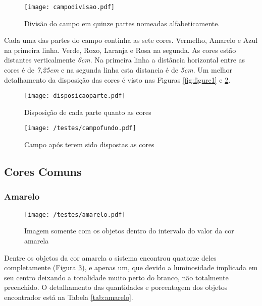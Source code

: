 \begin{figure}[H]
		\centering
		\texttt{[image: campodivisao.pdf]}
		\caption{Divisão do campo em quinze partes nomeadas alfabeticamente.}
		\label{campodivisao}
	\end{figure}
	
Cada uma das partes do campo continha as sete cores. Vermelho, Amarelo e Azul na primeira linha. Verde, Roxo, Laranja e Rosa na segunda. As cores estão distantes verticalmente \textit{6cm}. Na primeira linha a distância horizontal entre as cores é de \textit{7,25cm} e na segunda linha esta distancia é de \textit{5cm}. Um  melhor detalhamento da disposição das cores é visto nas Figuras \ref{fig:figure1} e \ref{fig:figure2}.


\begin{figure}[H]
\begin{minipage}[b]{0.45\linewidth}
\centering
\texttt{[image: disposicaoparte.pdf]}
\caption{Disposição de cada parte quanto as cores}
\label{fig:figure1}
\end{minipage}
\hspace{0.5cm}
\begin{minipage}[b]{0.45\linewidth}
\centering
\texttt{[image: /testes/campofundo.pdf]}
\caption{Campo após terem sido dispostas as cores}
\label{fig:figure2}
\end{minipage}
\end{figure}

\subsection{Cores Comuns}
\subsubsection{Amarelo}
	\begin{figure}[H]
		\centering
		\texttt{[image: /testes/amarelo.pdf]}
		\caption{Imagem somente com os objetos dentro do intervalo do valor da cor amarela}
		\label{fig:amarelo}
	\end{figure}
	
	Dentre os objetos da cor amarela o sistema encontrou quatorze deles completamente (Figura \ref{fig:amarelo}), e apenas um, que devido a luminosidade implicada em seu centro deixando a tonalidade muito perto do branco, não totalmente preenchido. O detalhamento das quantidades e porcentagem dos objetos encontrador está na Tabela \ref{tab:amarelo}.
	
